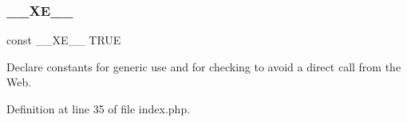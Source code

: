 \mbox{\label{index_8php_a697de427d83b791899ae45d555377756}} 
\subsubsection{\texorpdfstring{\+\_\+\+\_\+\+X\+E\+\_\+\+\_\+}{\_\_XE\_\_}}
{\footnotesize\ttfamily const \+\_\+\+\_\+\+X\+E\+\_\+\+\_\+ T\+R\+UE}



Declare constants for generic use and for checking to avoid a direct call from the Web. 



Definition at line 35 of file index.\+php.

